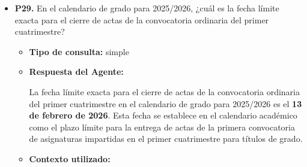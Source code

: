 \documentclass{article}
\begin{document}
\begin{itemize}
\begin{itemize}
                        Según el calendario académico 2025-2026, no se proporcionan fechas específicas para los exámenes de la convocatoria extraordinaria de septiembre para los recién matriculados en primer curso. Sin embargo, se menciona que la convocatoria de septiembre se extenderá hasta el fin del plazo que se establezca en la 3ª convocatoria del curso siguiente, pero esto se refiere a la presentación de los trabajos fin de máster.

                        En cuanto a los exámenes de las asignaturas, se establecen diferentes periodos de exámenes para las convocatorias, pero no se especifica una convocatoria extraordinaria de septiembre para los recién matriculados en primer curso.

                        Es importante destacar que el calendario académico proporciona fechas para las convocatorias de exámenes finales, pero no especifica fechas para una convocatoria extraordinaria de septiembre para los recién matriculados en primer curso. Por lo tanto, no se pueden proporcionar fechas exactas para esta convocatoria.

                        Si necesitas más información, te recomiendo consultar directamente con la universidad o revisar el calendario académico para obtener más detalles.
                  \item \textbf{Contexto utilizado:}

            \end{itemize}

      \item \textbf{P29.} En el calendario de grado para 2025/2026, ¿cuál es la fecha límite exacta para el cierre de actas de la convocatoria ordinaria del primer cuatrimestre? \\
            \begin{itemize}
                  \item \textbf{Tipo de consulta:} simple
                  \item \textbf{Respuesta del Agente:}

                        La fecha límite exacta para el cierre de actas de la convocatoria ordinaria del primer cuatrimestre en el calendario de grado para 2025/2026 es el \textbf{13 de febrero de 2026}. Esta fecha se establece en el calendario académico como el plazo límite para la entrega de actas de la primera convocatoria de asignaturas impartidas en el primer cuatrimestre para títulos de grado.
                  \item \textbf{Contexto utilizado:}


\end{itemize}
\end{itemize}
\end{document}
